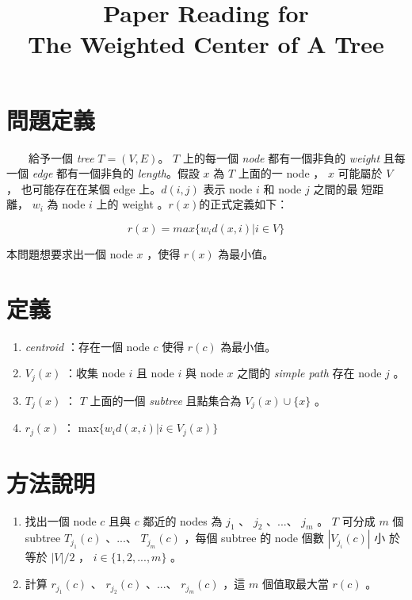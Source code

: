 \documentclass[12pt]{article}
\title{\bf{Paper Reading for\\ The Weighted Center of A Tree}}
\date{}
\begin{document}
\begin{CJK}{UTF8}{bkai}

\maketitle

\section{問題定義}
~~~~給予一個 {\it tree} $T=(V,E)$。 $T$ 上的每一個 {\it node} 都有一個非負的 {\it weight}
且每一個 {\it edge} 都有一個非負的 {\it length}。假設 $x$ 為 $T$ 上面的一 node ， $x$
 可能屬於 $V$ ， 也可能存在在某個 edge 上。$d(i,j)$ 表示 node $i$ 和 node $j$ 之間的最
短距離， $w_i$ 為 node $i$ 上的 weight 。$r(x)$的正式定義如下：

\begin{equation}
r(x)=max\{w_id(x,i)|i\in V\}
\end{equation}

本問題想要求出一個 node $x$ ，使得 $r(x)$ 為最小值。

\section{定義}

\begin{enumerate}
\item {\it centroid} ：存在一個 node $c$ 使得 $r(c)$ 為最小值。
\item $V_j(x)$ ：收集 node $i$ 且 node $i$ 與 node $x$ 之間的 {\it simple path} 存在
 node $j$ 。
\item $T_j(x)$ ： $T$ 上面的一個 {\it subtree} 且點集合為 $V_j(x) \cup \{x\}$ 。
\item $r_j(x)$ ： max$\{w_id(x,i)|i \in V_j(x)\}$
\end{enumerate}

\section{方法說明}

\begin{enumerate}

\item 找出一個 node $c$ 且與 $c$ 鄰近的 nodes 為 $j_1$ 、 $j_2$ 、...、 $j_m$ 。 $T$ 可分成
 $m$ 個 subtree $T_{j_1}(c)$ 、...、 $T_{j_m}(c)$ ，每個 subtree 的 node 個數 $|V_{j_i}(c)|$ 小
於等於 $|V|/2$ ， $i \in \{1,2,...,m\}$ 。

\item 計算 $r_{j_1}(c)$ 、 $r_{j_2}(c)$ 、...、 $r_{j_m}(c)$ ，這 $m$ 個值取最大當 $r(c)$ 。


\end{enumerate}
\end{CJK}
\end{document}
